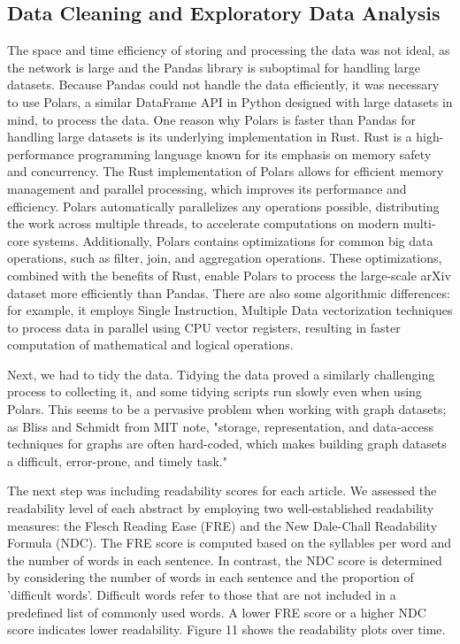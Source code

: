 \documentclass[final]{article}
\begin{document}
\subsection{Data Cleaning and Exploratory Data Analysis}
The space and time efficiency of storing and processing the data was not ideal, as the network is large and the Pandas library is suboptimal for handling large datasets. Because Pandas could not handle the data efficiently, it was necessary to use Polars, a similar DataFrame API in Python designed with large datasets in mind, to process the data. One reason why Polars is faster than Pandas for handling large datasets is its underlying implementation in Rust. Rust is a high-performance programming language known for its emphasis on memory safety and concurrency. The Rust implementation of Polars allows for efficient memory management and parallel processing, which improves its performance and efficiency. Polars  automatically parallelizes any operations possible, distributing the work across multiple threads, to accelerate computations on modern multi-core systems. Additionally, Polars contains optimizations for common big data operations, such as filter, join, and aggregation operations. These optimizations, combined with the benefits of Rust, enable Polars to process the large-scale arXiv dataset more efficiently than Pandas. There are also some algorithmic differences: for example, it employs Single Instruction, Multiple Data vectorization techniques to process data in parallel using CPU vector registers, resulting in faster computation of mathematical and logical operations. \cite{pandas}

Next, we had to tidy the data. Tidying the data proved a similarly challenging process to collecting it, and some tidying scripts run slowly even when using Polars. This seems to be a pervasive problem when working with graph datasets; as Bliss and Schmidt from MIT note, "storage, representation, and data-access techniques for graphs are often hard-coded, which makes building graph datasets a difficult, error-prone, and timely task." \cite{Bliss2018} 

The next step was including readability scores for each article. We assessed the readability level of each abstract by employing two well-established readability measures: the Flesch Reading Ease (FRE) and the New Dale-Chall Readability Formula (NDC). The FRE score is computed based on the syllables per word and the number of words in each sentence. In contrast, the NDC score is determined by considering the number of words in each sentence and the proportion of 'difficult words'. Difficult words refer to those that are not included in a predefined list of commonly used words. A lower FRE score or a higher NDC score indicates lower readability. \cite{readability} Figure 11 shows the readability plots over time. 
\end{document}
